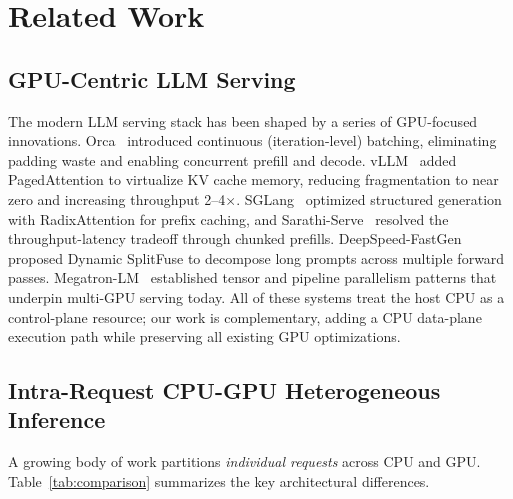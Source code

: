 \documentclass[10pt,conference]{IEEEtran}
\begin{document}
\section{Related Work}
\label{sec:related}

\subsection{GPU-Centric LLM Serving}
The modern LLM serving stack has been shaped by a series of GPU-focused innovations.
Orca~\cite{yu2022orca} introduced continuous (iteration-level) batching, eliminating padding waste and enabling concurrent prefill and decode.
vLLM~\cite{kwon2023vllm} added PagedAttention to virtualize KV cache memory, reducing fragmentation to near zero and increasing throughput 2--4$\times$.
SGLang~\cite{zheng2024sglang} optimized structured generation with RadixAttention for prefix caching, and Sarathi-Serve~\cite{agrawal2024sarathiserve} resolved the throughput-latency tradeoff through chunked prefills.
DeepSpeed-FastGen~\cite{holmes2024deepspeedfastgen} proposed Dynamic SplitFuse to decompose long prompts across multiple forward passes.
Megatron-LM~\cite{shoeybi2019megatron} established tensor and pipeline parallelism patterns that underpin multi-GPU serving today.
All of these systems treat the host CPU as a control-plane resource; our work is complementary, adding a CPU data-plane execution path while preserving all existing GPU optimizations.

\subsection{Intra-Request CPU-GPU Heterogeneous Inference}
\label{sec:related-hetero}
A growing body of work partitions \emph{individual requests} across CPU and GPU.
Table~\ref{tab:comparison} summarizes the key architectural differences.
\end{document}
